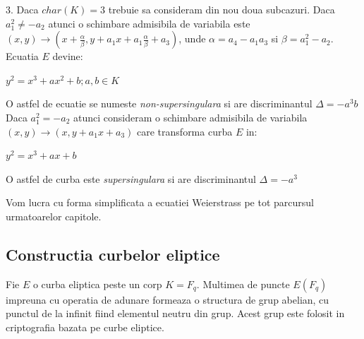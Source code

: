 \begin{dfn}
3. Daca $char(K) = 3$ trebuie sa consideram din nou doua subcazuri. Daca $a_1^2 \neq -a_2$ atunci o schimbare admisibila de variabila este
$(x, y) \rightarrow (x + \frac{\alpha}{\beta}, y + a_1x + a_1\frac{\alpha}{\beta} + a_3)$, unde $\alpha = a_4 -a_1a_3$ si $\beta = a_1^2 - a_2$. Ecuatia $E$ devine: 
\begin{center} $y^2 = x^3 + ax^2 + b; a, b\in K$\end{center}
O astfel de ecuatie se numeste \textit{non-supersingulara} si are discriminantul $\Delta = -a^3b$ \\
Daca $a_1^2 = -a_2$ atunci consideram o schimbare admisibila de variabila $(x, y) \rightarrow (x, y + a_1x + a_3)$ care transforma curba $E$ in:
\begin{center} $y^2 = x^3 + ax + b$ \end{center}
O astfel de curba este \textit{supersingulara} si are discriminantul $\Delta = -a^3$
\end{dfn}

\begin{obs}
Vom lucra cu forma simplificata a ecuatiei Weierstrass pe tot parcursul urmatoarelor capitole.
\end{obs}

\subsection{Constructia curbelor eliptice}
\label{subsec:subsec01}

\begin{dfn}
Fie $E$ o curba eliptica peste un corp $K = F_q$. Multimea de puncte $E(F_q)$ impreuna cu operatia de adunare formeaza o structura de grup abelian, cu punctul de la infinit fiind elementul neutru din grup. Acest grup este folosit in criptografia bazata pe curbe eliptice.
\end{dfn}

